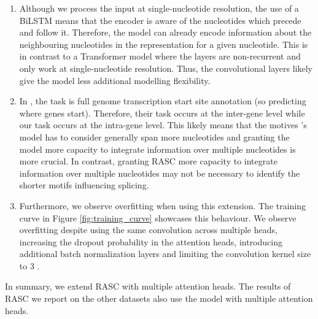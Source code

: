 \begin{enumerate}
	\item Although we process the input at single-nucleotide resolution, the use of a BiLSTM means that the encoder is aware of the nucleotides which precede and follow it. Therefore, the model can already encode information about the neighbouring nucleotides in the representation for a given nucleotide. This is in contrast to a Transformer model where the layers are non-recurrent and only work at single-nucleotide resolution. Thus, the convolutional layers likely give the model less additional modelling flexibility.
	\item In \cite{ghentransformers}, the task is full genome transcription start site annotation (so predicting where genes start). Therefore, their task occurs at the inter-gene level while our task occurs at the intra-gene level. This likely means that the motives \cite{ghentransformers}'s model has to consider generally span more nucleotides and granting the model more capacity to integrate information over multiple nucleotides is more crucial. 
	In contrast, granting RASC more capacity to integrate information over multiple nucleotides may not be necessary to identify the shorter motifs influencing splicing. 
	\item Furthermore, we observe overfitting when using this extension. The training curve in Figure \ref{fig:training_curve}
	showcases this behaviour. We observe overfitting despite using the same convolution across multiple heads, increasing the dropout probability in the attention heads, introducing additional batch normalization layers and limiting the convolution kernel size to 3 
	. 
\end{enumerate}


In summary, we extend RASC with multiple attention heads. The results of RASC we report on the other datasets also use the model with multiple attention heads. 



